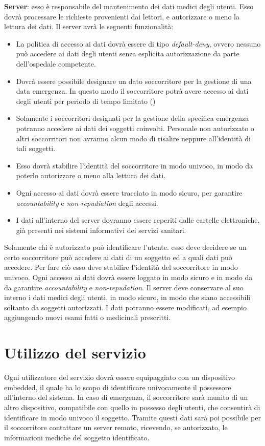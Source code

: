 \documentclass[a4paper,12pt]{report}
\begin{document}
\begin{description}
	\item \textbf{Server}: esso è responsabile del mantenimento dei dati medici degli utenti. Esso dovrà processare le richieste provenienti dai lettori, e autorizzare o meno la lettura dei dati. Il server avrà le seguenti funzionalità:
	\begin{itemize}
		\item La politica di accesso ai dati dovrà essere di tipo \emph{default-deny}, ovvero nessuno può accedere ai dati degli utenti senza esplicita autorizzazione da parte dell'ospedale competente. 
		\item Dovrà essere possibile designare un dato soccorritore per la gestione di una data emergenza. In questo modo il soccorritore potrà avere accesso ai dati degli utenti per periodo di tempo limitato ()
		\item Solamente i soccorritori designati per la gestione della specifica emergenza potranno accedere ai dati dei soggetti coinvolti. Personale non autorizzato o altri soccorritori non avranno alcun modo di risalire neppure all'identità di tali soggetti.
		\item Esso dovrà stabilire l'identità del soccorritore in modo univoco, in modo da poterlo autorizzare o meno alla lettura dei dati.  
		\item Ogni accesso ai dati dovrà essere tracciato in modo sicuro, per garantire \emph{accountability} e \emph{non-repudiation} degli accessi.
		\item I dati all'interno del server dovranno essere reperiti dalle cartelle elettroniche, già presenti nei sistemi informativi dei servizi sanitari. 
	\end{itemize}
	
	
	
	
	
	Solamente chi è autorizzato può identificare l'utente. esso deve decidere se un certo soccorritore può accedere ai dati di un soggetto ed a quali dati può accedere. Per fare ciò esso deve stabilire l'identità del soccorritore in modo univoco. Ogni accesso ai dati dovrà essere loggato in modo sicuro e in modo da da garantire \emph{accountability} e \emph{non-repudation}. Il server deve conservare al suo interno i dati medici degli utenti, in modo sicuro, in modo che siano accessibili soltanto da soggetti autorizzati. I dati potranno essere modificati, ad esempio aggiungendo nuovi esami fatti o medicinali prescritti. 
\end{description}

\section{Utilizzo del servizio}
Ogni utilizzatore del servizio dovrà essere equipaggiato con un dispositivo embedded, il quale ha lo scopo di identificare univocamente il possessore all'interno del sistema. In caso di emergenza, il soccorritore sarà munito di un altro dispositivo, compatibile con quello in possesso degli utenti, che consentirà di identificare in modo univoco il soggetto. Tramite questi dati sarà poi possibile per il soccorritore contattare un server remoto, ricevendo, se autorizzato, le informazioni mediche del soggetto identificato.
\end{document}

